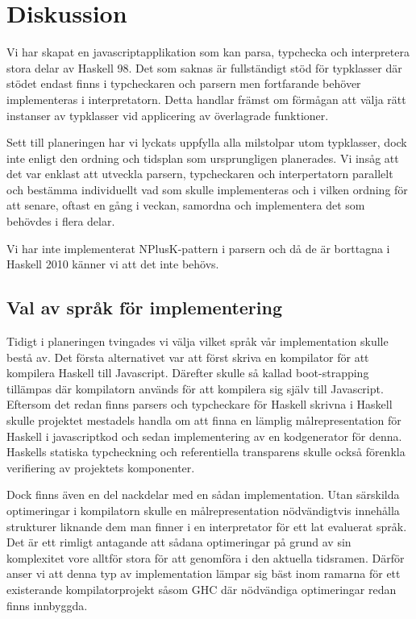 \section{Diskussion}
Vi har skapat en javascriptapplikation som kan parsa, typchecka och interpretera stora delar av Haskell 98. Det som saknas är fullständigt stöd för typklasser där stödet endast finns i typcheckaren och parsern men fortfarande behöver implementeras i interpretatorn. Detta handlar främst om förmågan att välja rätt instanser av typklasser vid applicering av överlagrade funktioner.

Sett till planeringen har vi lyckats uppfylla alla milstolpar utom typklasser, dock inte enligt den ordning och tidsplan som ursprungligen planerades. 
Vi insåg att det var enklast att utveckla parsern, typcheckaren och interpertatorn parallelt och bestämma individuellt vad som skulle implementeras och i 
vilken ordning för att senare, oftast en gång i veckan, samordna och implementera det som behövdes i flera delar.

Vi har inte implementerat NPlusK-pattern i parsern och då de är borttagna i Haskell 2010 \citep{haskell2010} känner vi att det inte behövs.

\subsection{Val av språk för implementering}
Tidigt i planeringen tvingades vi välja vilket språk vår implementation skulle
bestå av. Det första alternativet var att först skriva en kompilator för att
kompilera Haskell till Javascript. Därefter skulle så kallad boot-strapping
tillämpas där kompilatorn används för att kompilera sig själv till
Javascript. Eftersom det redan finns parsers och typcheckare för Haskell
skrivna i Haskell skulle projektet mestadels handla om att finna en lämplig
målrepresentation för Haskell i javascriptkod och sedan implementering av en
kodgenerator för denna. Haskells statiska typcheckning och referentiella
transparens skulle också förenkla verifiering av projektets komponenter.

Dock finns även en del nackdelar med en sådan implementation. Utan särskilda
optimeringar i kompilatorn skulle en målrepresentation nödvändigtvis innehålla
strukturer liknande dem man finner i en interpretator för ett lat evaluerat
språk. Det är ett rimligt antagande att sådana optimeringar på grund av sin komplexitet vore alltför stora för att genomföra i den aktuella tidsramen. Därför anser vi att denna typ av implementation lämpar sig bäst inom
ramarna för ett existerande kompilatorprojekt såsom GHC där nödvändiga optimeringar redan finns innbyggda.

